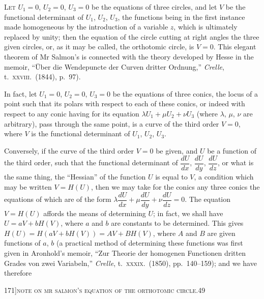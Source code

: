 \documentclass[11pt]{article}
\begin{document}
\bigskip

\textsc{Let} $U_{1} = 0$, $U_{2} = 0$, $U_{3} = 0$ be the equations of three circles, and let $V$ be the
functional determinant of $U_{1}$, $U_{2}$, $U_{3}$, the functions being in the first instance made
homogeneous by the introduction of a variable $z$, which is ultimately replaced by
unity; then the equation of the circle cutting at right angles the three given circles,
or, as it may be called, the orthotomic circle, is $V = 0$. This elegant theorem of
Mr Salmon's is connected with the theory developed by Hesse in the memoir, ``\"Uber
die Wendepuncte der Curven dritter Ordnung,'' \textit{Crelle}, t.~\textsc{xxviii}.\ (1844), p.~97).

In fact, let $U_{1} = 0$, $U_{2} = 0$, $U_{3} = 0$ be the equations of three conics, the locus of
a point such that its polars with respect to each of these conics, or indeed with
respect to any conic having for its equation $\lambda U_{1} + \mu U_{2} + \nu U_{3}$ (where $\lambda$, $\mu$, $\nu$ are
arbitrary), pass through the same point, is a curve of the third order $V = 0$, where
$V$ is the functional determinant of $U_{1}$, $U_{2}$, $U_{3}$.

Conversely, if the curve of the third order $V = 0$ be given, and $U$ be a function
of the third order, such that the functional determinant of $\dfrac{dU}{dx}$, $\dfrac{dU}{dy}$, $\dfrac{dU}{dz}$, or what
is the same thing, the ``Hessian'' of the function $U$ is equal to $V$, a condition
which may be written $V = H(U)$, then we may take for the conics any three conics
the equations of which are of the form $\lambda \dfrac{dU}{dx} + \mu \dfrac{dU}{dy} + \nu \dfrac{dU}{dz} = 0$. The equation $V = H(U)$
affords the means of determining $U$; in fact, we shall have $U = aV + bH(V)$, where $a$ and $b$
are constants to be determined. This gives $H(U) = H(aV + bH(V)) = A V + B H(V)$, where
$A$ and $B$ are given functions of $a$, $b$ (a practical method of determining these functions
was first given in Aronhold's memoir, ``Zur Theorie der homogenen Functionen dritten
Grades von zwei Variabeln,'' \textit{Crelle}, t.~\textsc{xxxix}.\ (1850), pp.~140--159); and we have therefore

\newpage

\begin{center}
\small 171]\hfill\textsc{note on mr salmon's equation of the orthotomic circle.}\hfill\textsc{49}
\end{center}
\end{document}
